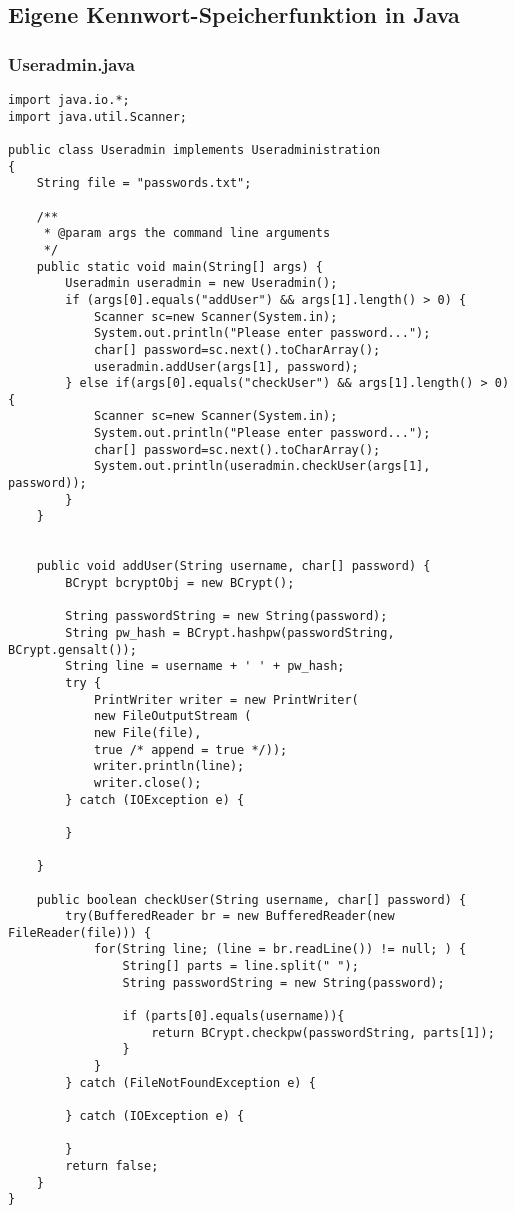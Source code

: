 \documentclass[10pt,a4paper]{article}
\begin{document}
\subsection*{Eigene Kennwort-Speicherfunktion in Java}
\subsubsection*{Useradmin.java}
\begin{verbatim}
import java.io.*;
import java.util.Scanner;

public class Useradmin implements Useradministration
{
    String file = "passwords.txt";

    /**
     * @param args the command line arguments
     */
    public static void main(String[] args) {
        Useradmin useradmin = new Useradmin();
        if (args[0].equals("addUser") && args[1].length() > 0) {
            Scanner sc=new Scanner(System.in);
            System.out.println("Please enter password...");
            char[] password=sc.next().toCharArray();
            useradmin.addUser(args[1], password);
        } else if(args[0].equals("checkUser") && args[1].length() > 0) {
            Scanner sc=new Scanner(System.in);
            System.out.println("Please enter password...");
            char[] password=sc.next().toCharArray();
            System.out.println(useradmin.checkUser(args[1], password));
        }
    }
    
    
    public void addUser(String username, char[] password) {
        BCrypt bcryptObj = new BCrypt();
        
        String passwordString = new String(password);
        String pw_hash = BCrypt.hashpw(passwordString, BCrypt.gensalt());
        String line = username + ' ' + pw_hash;
        try {
            PrintWriter writer = new PrintWriter(
            new FileOutputStream (
            new File(file), 
            true /* append = true */));
            writer.println(line);
            writer.close();
        } catch (IOException e) {
            
        }
        
    }
    
    public boolean checkUser(String username, char[] password) {
        try(BufferedReader br = new BufferedReader(new FileReader(file))) {
            for(String line; (line = br.readLine()) != null; ) {
                String[] parts = line.split(" ");
                String passwordString = new String(password);
            
                if (parts[0].equals(username)){
                    return BCrypt.checkpw(passwordString, parts[1]);
                }
            }
        } catch (FileNotFoundException e) {
        
        } catch (IOException e) {
        
        }
        return false;
    }
}
\end{verbatim}
\end{document}
